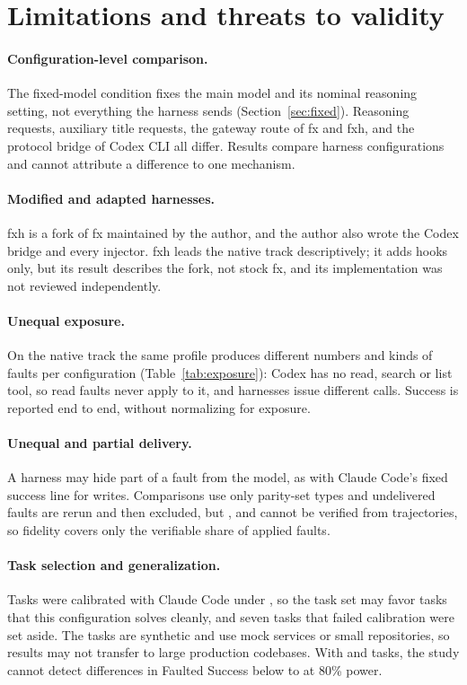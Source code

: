 \section{Limitations and threats to validity}
\label{sec:threats}

\paragraph{Configuration-level comparison.}
The fixed-model condition fixes the main model and its nominal reasoning setting, not everything the harness sends (Section~\ref{sec:fixed}).
Reasoning requests, auxiliary title requests, the gateway route of fx and fxh, and the protocol bridge of Codex CLI all differ.
Results compare harness configurations and cannot attribute a difference to one mechanism.

\paragraph{Modified and adapted harnesses.}
fxh is a fork of fx maintained by the author, and the author also wrote the Codex bridge and every injector.
fxh leads the native track descriptively; it adds hooks only, but its result describes the fork, not stock fx, and its implementation was not reviewed independently.

\paragraph{Unequal exposure.}
On the native track the same profile produces different numbers and kinds of faults per configuration (Table~\ref{tab:exposure}): Codex has no read, search or list tool, so read faults never apply to it, and harnesses issue different calls.
Success is reported end to end, without normalizing for exposure.

\paragraph{Unequal and partial delivery.}
A harness may hide part of a fault from the model, as with Claude Code's fixed success line for writes.
Comparisons use only parity-set types and undelivered faults are rerun and then excluded, but ,  and  cannot be verified from trajectories, so fidelity covers only the verifiable share of applied faults.

\paragraph{Task selection and generalization.}
Tasks were calibrated with Claude Code under , so the task set may favor tasks that this configuration solves cleanly, and seven tasks that failed calibration were set aside.
The tasks are synthetic and use mock services or small repositories, so results may not transfer to large production codebases.
With \cmcaTrackSTasks{} and \cmcaTrackNFixedTasks{} tasks, the study cannot detect differences in Faulted Success below \cmcaTrackNFixedMddMin{} to \cmcaTrackSMddMax{} at 80\% power.

